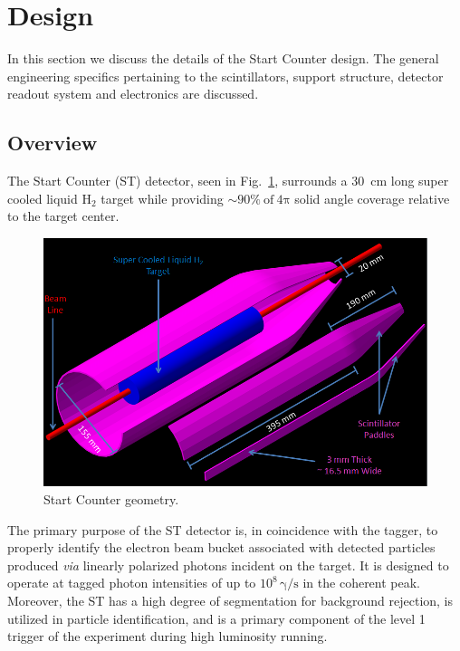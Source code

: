 \section{Design} \label{sec:design}

In this section we discuss the details of the \gx{} Start Counter design.  The general engineering specifics pertaining to the scintillators, support structure, detector readout system and electronics are discussed.

\subsection{Overview} \label{sec:design_overview}
The Start Counter (ST) detector, seen in Fig.~\ref{fig:st-geo}, surrounds a 30~cm long super cooled liquid $\mathrm{H_{2}}$ target while providing $\sim 90 \%\ \mathrm{of\ 4 \pi}$ solid angle coverage relative to the target center.
\begin{figure}[!htb]
	\centering
	\includegraphics[width=1.0\columnwidth]{design/figs/30_Element_Pieces_Removed}
	\caption[Start Counter geometry]{Start Counter geometry.}
	\label{fig:st-geo}
\end{figure}
The primary purpose of the ST detector is, in coincidence with the tagger, to properly identify the electron beam bucket associated with detected particles produced \textit{via} linearly polarized photons incident on the target. It is designed to operate at tagged photon intensities of up to $10^{8}\,\mathrm{\gamma/s}$ in the coherent peak.  Moreover, the ST has a high degree of segmentation for background rejection, is utilized in particle identification, and is a primary component of the level 1 trigger of the \gx{} experiment during high luminosity running\cite{pooser16}.

